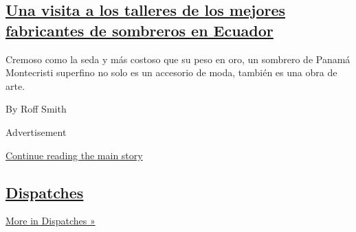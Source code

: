 \begin{enumerate}
{  \subsection{\texorpdfstring{\href{/es/2020/07/28/espanol/estilos-de-vida/sombreros-toquilla-panama-ecuador.html}{Una
  visita a los talleres de los mejores fabricantes de sombreros en
  Ecuador}}{Una visita a los talleres de los mejores fabricantes de sombreros en Ecuador}}\label{una-visita-a-los-talleres-de-los-mejores-fabricantes-de-sombreros-en-ecuador}}

  Cremoso como la seda y más costoso que su peso en oro, un sombrero de
  Panamá Montecristi superfino no solo es un accesorio de moda, también
  es una obra de arte.

  By Roff Smith
\end{enumerate}

Advertisement

\protect\hyperlink{after-mid2}{Continue reading the main story}

\hypertarget{dispatches}{%
\subsection{\texorpdfstring{\href{/spotlight/dispatches-international}{Dispatches}}{Dispatches}}\label{dispatches}}

\href{/spotlight/dispatches-international}{More in Dispatches »}

